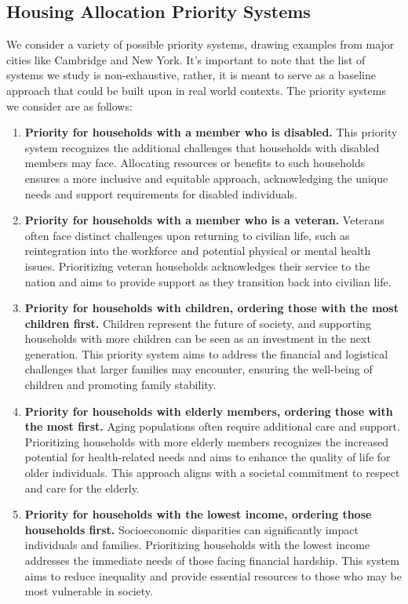 \documentclass[11pt]{article}
\begin{document}
\subsection{Housing Allocation Priority Systems}
We consider a variety of possible priority systems, drawing examples from major cities like Cambridge and New York. It's important to note that the list of systems we study is non-exhaustive, rather, it is meant to serve as a baseline approach that could be built upon in real world contexts. The priority systems we consider are as follows:
\begin{enumerate}
    \item \textbf{Priority for households with a member who is disabled.} This priority system recognizes the additional challenges that households with disabled members may face. Allocating resources or benefits to such households ensures a more inclusive and equitable approach, acknowledging the unique needs and support requirements for disabled individuals.
    \item \textbf{Priority for households with a member who is a veteran.} Veterans often face distinct challenges upon returning to civilian life, such as reintegration into the workforce and potential physical or mental health issues. Prioritizing veteran households acknowledges their service to the nation and aims to provide support as they transition back into civilian life.
    \item \textbf{Priority for households with children, ordering those with the most children first.} Children represent the future of society, and supporting households with more children can be seen as an investment in the next generation. This priority system aims to address the financial and logistical challenges that larger families may encounter, ensuring the well-being of children and promoting family stability.
    \item \textbf{Priority for households with elderly members, ordering those with the most first.} Aging populations often require additional care and support. Prioritizing households with more elderly members recognizes the increased potential for health-related needs and aims to enhance the quality of life for older individuals. This approach aligns with a societal commitment to respect and care for the elderly.
    \item \textbf{Priority for households with the lowest income, ordering those households first.} Socioeconomic disparities can significantly impact individuals and families. Prioritizing households with the lowest income addresses the immediate needs of those facing financial hardship. This system aims to reduce inequality and provide essential resources to those who may be most vulnerable in society.

\end{enumerate}
\end{document}
